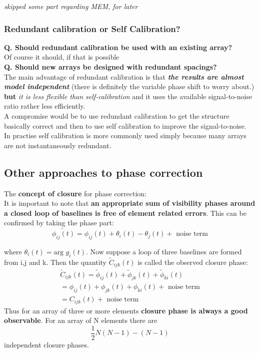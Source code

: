 \documentclass[10pt]{report}
\newcommand{\tbf}[1]{\textbf{#1}}
\newcommand{\tit}[1]{\textit{#1}}
\begin{document}
\tit{skipped some part regarding MEM, for later}

\subsubsection{Redundant calibration or Self Calibration?}
\tbf{Q. Should redundant calibration be used with an existing array?}\\

Of course it should, if that is possible\\

\tbf{Q. Should new arrays be designed with redundant spacings?}\\

The main advantage of redundant calibration is that \tbf{\tit{the results are almost model independent}} (there is definitely the variable phase shift to worry about.) \tbf{but} \tit{it is less flexible than self-calibration} and it uses the available signal-to-noise ratio rather less efficiently.\\


A compromise would be to use redundant calibration to get the structure basically correct and then to use self calibration to improve the signal-to-noise.\\

In practise self calibration is more commonly used simply because many arrays are not instantaneously redundant.\\

\subsection{Other approaches to phase correction}

The \tbf{concept of closure} for phase correction:\\

It is important to note that \tbf{an appropriate sum of visibility phases around a closed loop of baselines is free of element related errors}. This can be confirmed by taking the phase part:
\begin{equation}
\tilde{\phi_{ij}(t)}=\phi_{ij}(t)+\theta_i(t)-\theta_j(t)+\text{ noise term}
\end{equation}

where $\theta_i(t)=\text{arg }g_i(t)$. Now suppose a loop of three baselines are formed from i,j and k. Then the quantity $\tilde{C}_{ijk}(t)$ is called the observed closure phase:
\begin{eqnarray}
\tilde{C}_{ijk}(t)=\tilde{\phi}_{ij}(t)+\tilde{\phi}_{jk}(t)+\tilde{\phi}_{ki}(t)\\
=\phi_{ij}(t)+\phi_{jk}(t)+\phi_{ki}(t)+ \text{ noise term}\\
=C_{ijk}(t)+ \text{ noise term}
\end{eqnarray}
Thus for an array of three or more elements \tbf{closure phase is always a good observable}. For an array of N elements there are 
\begin{equation}
\frac{1}{2}N(N-1)-(N-1)
\end{equation}
independent closure phases.\\
\end{document}
